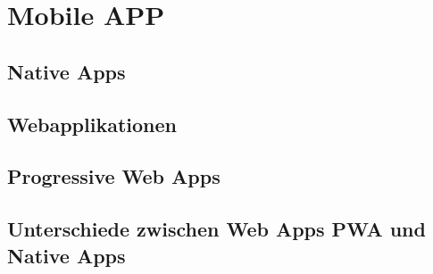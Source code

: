 \newpage
\section{Mobile APP}


\subsection{Native Apps}





\subsection{Webapplikationen}


\subsection{Progressive Web Apps}


\subsection{Unterschiede zwischen Web Apps PWA und Native Apps}

\newpage
























